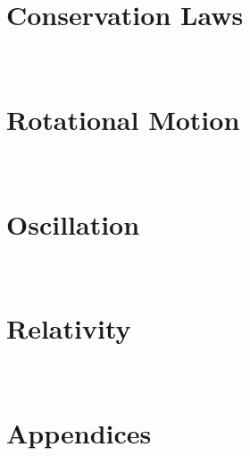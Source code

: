 \documentclass[english,twoside]{labmanual} %
\begin{document}
\part{Conservation Laws}
\











\part{Rotational Motion}
\






\part{Oscillation}
\




\part{Relativity}
\



\part{Appendices}
\
\appendix







\end{document}
